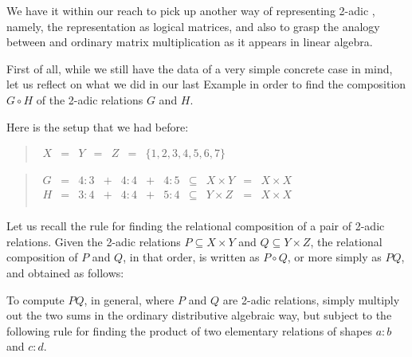 \documentclass[12pt]{article}
\begin{document}

We have it within our reach to pick up another way of representing 2-adic , namely, the representation as logical matrices, and also to grasp the analogy between  and ordinary matrix multiplication as it appears in linear algebra.

First of all, while we still have the data of a very simple concrete case in mind, let us reflect on what we did in our last Example in order to find the composition $G \circ H$ of the 2-adic relations $G$ and $H$.

Here is the setup that we had before:

\begin{quote}$\begin{array}{lllllll}
X & = & Y & = & Z & = & \mathrm{ \{ 1, 2, 3, 4, 5, 6, 7 \} }
\end{array}$\end{quote}

\begin{quote}$\begin{array}{lllllllllll}
G & = & 4:3 & + & 4:4 & + & 4:5 & \subseteq & X \times Y & = & X \times X \\
H & = & 3:4 & + & 4:4 & + & 5:4 & \subseteq & Y \times Z & = & X \times X \\
\end{array}$\end{quote}

Let us recall the rule for finding the relational composition of a pair of 2-adic relations.  Given the 2-adic relations $P \subseteq X \times Y$ and $Q \subseteq Y \times Z$, the relational composition of $P$ and $Q$, in that order, is written as $P \circ Q$, or more simply as $PQ$, and obtained as follows:

To compute $PQ$, in general, where $P$ and $Q$ are 2-adic relations, simply multiply out the two sums in the ordinary distributive algebraic way, but subject to the following rule for finding the product of two elementary relations of shapes $a:b$ and $c:d$.
\end{document}

